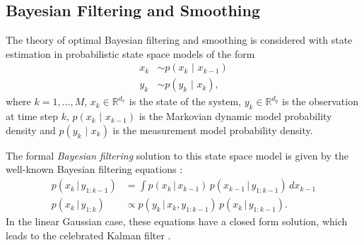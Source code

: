 \documentclass[twocolumn]{autart}    %
\begin{document}
\subsection{Bayesian Filtering and Smoothing}
%
The theory of optimal Bayesian filtering and smoothing
\cite{Ho+Lee:1964,Lee:1964} is considered with state estimation in
probabilistic state space models of the form
%
\begin{equation}
\begin{split}
  x_k &\sim p(x_k \, \,|\, \, x_{k-1}) \\
  y_k &\sim p(y_k \, \,|\, \, x_{k}),
\end{split}
\label{eq:genmodel}
\end{equation}
%
where $k=1,\ldots,M$, $x_k \in \mathbb{R}^{d_x}$ is the state of the
system, $y_k \in \mathbb{R}^{d_y}$ is the observation at time step
$k$, $p(x_k \, \,|\, \, x_{k-1})$ is the Markovian dynamic model
probability density and $p(y_k \, \,|\, \, x_{k})$ is the measurement
model probability density.

The formal {\em Bayesian filtering} solution to this state space model is
given by the well-known Bayesian filtering equations
\cite{Ho+Lee:1964}:
%
\begin{equation}
\begin{split}
   p(x_k \,|\, y_{1:k-1})
   &= \int p(x_k \,|\, x_{k-1}) \, p(x_{k-1} \,|\, y_{1:k-1}) \, dx_{k-1} \\
   p(x_k \,|\, y_{1:k})
   &\propto
   p(y_k \,|\, x_k,y_{1:k-1}) \, p(x_k \,|\, y_{1:k-1}).
\end{split}
\label{eq:bfilter}
\end{equation}
%
In the linear Gaussian case, these equations have a closed form
solution, which leads to the celebrated Kalman filter
\cite{Kalman:1960}.
\end{document}
